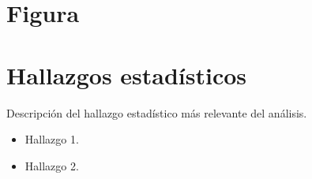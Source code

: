 \documentclass{../base/canon}
\begin{document}
\section{Figura}


\section{Hallazgos estadísticos}

\begin{KeyFindingBox}
  Descripción del hallazgo estadístico más relevante del análisis.
\end{KeyFindingBox}

\begin{itemize}
  \item Hallazgo 1.
  \item Hallazgo 2.
\end{itemize}


\ContactSignature
\end{document}
